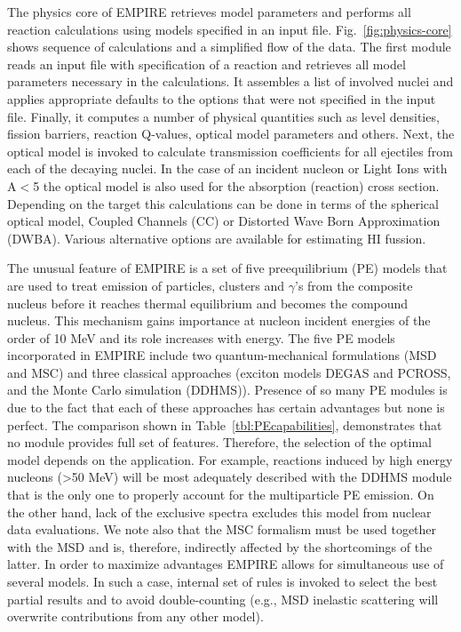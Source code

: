 \documentclass[twocolumn,amsmath,amssymb,10pt,groupedaddress,a4paper]{revtex4}
\begin{document}
The physics core of EMPIRE retrieves model parameters and performs all reaction calculations using models specified in an input file. Fig.~\ref{fig:physics-core} shows sequence of calculations and a simplified flow of the data. The first module reads an input file with specification of a reaction and retrieves all model parameters necessary in the calculations. It assembles a list of involved nuclei and  applies appropriate defaults to the options that were not specified in the input file. Finally, it computes a number of physical quantities such as level densities, fission barriers, reaction Q-values, optical model parameters and others. Next, the optical model is  invoked to calculate transmission coefficients for all ejectiles from each of the decaying nuclei. In the case of an incident nucleon or Light Ions with A$<$5 the optical model is also used for the absorption (reaction) cross section. Depending on the target this calculations can be done in terms of the spherical optical model, Coupled Channels (CC) or Distorted Wave Born Approximation (DWBA). Various alternative options are available for estimating HI fussion.

The unusual feature of EMPIRE is a set of five preequilibrium (PE) models that are used to treat emission of particles, clusters and $\gamma$'s from the composite nucleus before it reaches thermal equilibrium and becomes the compound nucleus. This mechanism gains importance at nucleon incident energies of the order of 10 MeV and its role increases with energy.  The five PE models incorporated in EMPIRE include two quantum-mechanical formulations (MSD and MSC) and three classical approaches (exciton models DEGAS and PCROSS, and the Monte Carlo simulation (DDHMS)). Presence of so many PE modules is due to the fact that each of these approaches has certain advantages but none is perfect. The comparison shown in  Table~\ref{tbl:PEcapabilities},  demonstrates that no module provides full set of features. Therefore, the selection of the optimal model depends on the application. For example, reactions induced by high energy nucleons (>50 MeV) will be most adequately described with the DDHMS module that is the only one to properly account for the multiparticle PE emission. On the other hand, lack of the exclusive spectra excludes this model from nuclear data evaluations. We note also that the MSC formalism must be used together with the MSD and is, therefore, indirectly affected by the shortcomings of the  latter. In order to maximize advantages EMPIRE allows for simultaneous use of several models. In such a case, internal set of rules is invoked to select the best partial results and to avoid double-counting (e.g., MSD inelastic scattering will overwrite contributions from any other model).
\end{document}
